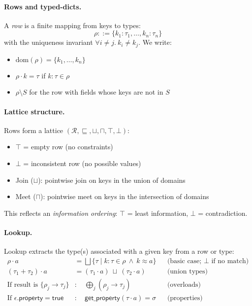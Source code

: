 \paragraph{Rows and typed-dicts.}
A \emph{row} is a finite mapping from keys to types:
\[
\rho ::= \{ k_1 : \tau_1, \dots, k_n : \tau_n \}
\]
with the uniqueness invariant $\forall i \neq j.\ k_i \neq k_j$.
We write:
\begin{itemize}
\item $\mathrm{dom}(\rho) = \{ k_1,\dots,k_n \}$
\item $\rho \cdot k = \tau$ if $k:\tau \in \rho$
\item $\rho \setminus S$ for the row with fields whose keys are not in $S$
\end{itemize}

\paragraph{Lattice structure.}
Rows form a lattice $(\mathcal{R}, \sqsubseteq, \sqcup, \sqcap, \top, \bot)$:
\begin{itemize}
\item $\top$ = empty row (no constraints)
\item $\bot$ = inconsistent row (no possible values)
\item Join ($\sqcup$): pointwise join on keys in the union of domains
\item Meet ($\sqcap$): pointwise meet on keys in the intersection of domains
\end{itemize}
This reflects an \emph{information ordering}: $\top$ = least information, $\bot$ = contradiction.

\paragraph{Lookup.}
Lookup extracts the type(s) associated with a given key from a row or type:
\begin{align*}
\rho \cdot a &= \bigsqcup \{ \tau \mid k:\tau \in \rho \ \wedge\ k \approx a \}
  &&\text{(basic case; $\bot$ if no match)}\\
(\tau_1 + \tau_2) \cdot a &= (\tau_1 \cdot a) \ \sqcup\ (\tau_2 \cdot a)
  &&\text{(union types)} \\
\text{If result is }\{\rho_j \to \tau_j\} &: \quad \bigoplus_j (\rho_j \to \tau_j)
  &&\text{(overloads)}\\
\text{If }\epsilon.\mathsf{property} = \mathsf{true} &: \quad \mathsf{get\_property}(\tau \cdot a) = \sigma
  &&\text{(properties)}
\end{align*}

